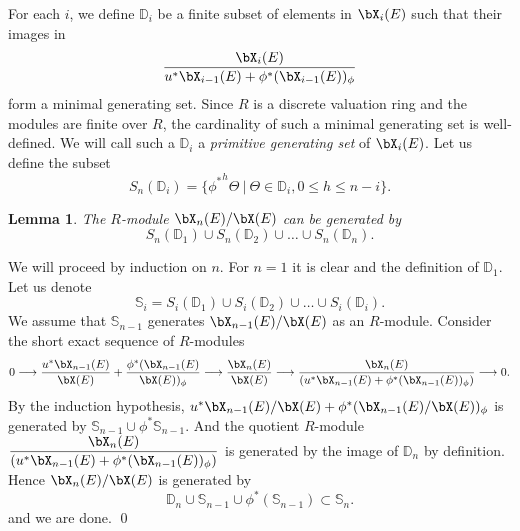 \documentclass{amsart}
\newtheorem {lemma}[theorem] {\bf Lemma}
\numberwithin {equation}{section}
\newcommand{\bb}[1]{\mathbb{#1}}
\begin{document}
 

For each $i$, we define $\bb{D}_i$ be a finite subset of elements in ${\bX}_{i}(E)$ such that 
their images in 
$$\dfrac{{\bX}_{i}(E)}{u^{*}{\bX}_{i-1}(E)+\phi^{*}({\bX}_{i-1}(E))_{\phi}}$$ 
form a minimal generating set.
Since $R$ is a discrete valuation ring and the modules are finite over $R$, the 
cardinality of such a minimal generating set is well-defined.
We will call such a $\mathbb{D}_{i}$ a \emph{primitive generating set} of ${\bX}_{i}(E)$. %
Let us define the subset $$S_{n}(\mathbb{D}_{i})=\{{\phi^{*}}^{h}\Theta ~|~\Theta\in \mathbb{D}_{i}, 0\leq h\leq n-i \} .$$
\begin{lemma} 
\label{SnR}
The  $R$-module $\bX_{n}(E)/\bX(E)$ can be generated by
$$ S_{n}(\mathbb{D}_{1})\cup S_{n}(\mathbb{D}_{2})\cup \ldots \cup S_{n}(\mathbb{D}_{n}) .$$
\end{lemma}
\proof We will proceed by induction on $n$. For $n=1$ it 
is clear and the definition of $\bb{D}_1$. 
Let us denote $$ \mathbb{S}_{i}=S_{i}(\mathbb{D}_{1})\cup S_{i}(\mathbb{D}_{2})\cup \ldots \cup S_{i}(\mathbb{D}_{i}).$$ We assume that $\mathbb{S}_{n-1}$ generates $\bX_{n-1}(E)/\bX(E)$ as an $R$-module. Consider the short exact sequence of  $R$-modules
$$0\longrightarrow \dfrac{u^{*}{\bX}_{n-1}(E)}{\bX(E)}+\dfrac{\phi^{*}(
{\bX}_{n-1}(E)}{\bX(E))_{\phi}}\longrightarrow\dfrac{{\bX}_{n}(E)}{\bX(E)}\longrightarrow\dfrac{{\bX}_{n}(E)}{(u^{*}{\bX}_{n-1}(E)+\phi^{*}(
{\bX}_{n-1}(E))_{\phi})}\longrightarrow 0.$$
By the induction hypothesis, $u^*\bX_{n-1}(E)/\bX(E) + \phi^*(\bX_{n-1}(E)/\bX(E))_\phi$
is generated by $\bb{S}_{n-1} \cup \phi^*\bb{S}_{n-1}$. And the quotient 
$R$-module $\dfrac{\bX_n(E)}{(u^*\bX_{n-1}(E)+ \phi^*(\bX_{n-1}(E))_\phi)}$
is generated by the image of $\bb{D}_n$ by definition. Hence $\bX_n(E)/\bX(E)$ is 
generated by 
$$\mathbb{D}_{n}\cup \mathbb S_{n-1}\cup \phi^{*}(\mathbb{S}_{n-1})\subset \mathbb{S}_{n}.$$
and we are done.
\qed

\end{document}
